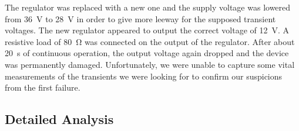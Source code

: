 The  regulator  was  replaced with a new one and the supply voltage was  lowered
from \SI{36}{\volt} to \SI{28}{\volt} in order  to  give  more  leeway  for  the
supposed transient voltages. The new  regulator  appeared  to output the correct
voltage of  \SI{12}{\volt}.  A  resistive load of \SI{80}{\ohm} was connected on
the output  of  the  regulator.  After  about  \SI{20}{\second}  of  continuous
operation,  the  output  voltage  again  dropped and the device was  permanently
damaged. Unfortunately, we were unable to capture some vital measurements of the
transients we were looking for to confirm our suspicions from the first failure.


\subsection{Detailed Analysis}


